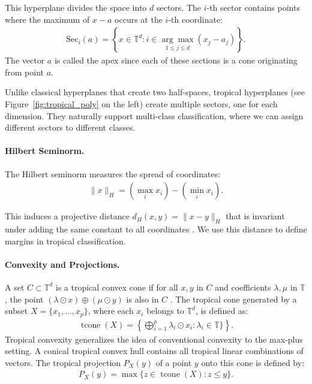 \documentclass{article}
\newcommand{\tcone}{\operatorname{tcone}}
\renewcommand{\leq}{\leqslant}
\newcommand{\trop}{\mathbb{T}}
\begin{document}
This hyperplane divides the space into $d$ sectors. The $i$-th sector contains points where the maximum of $x - a$ occurs at the $i$-th coordinate:
\begin{align}
\text{Sec}_i(a) = \left\{x \in \trop^d : i \in \underset{1\leq j\leq d}{\arg\max} (x_j - a_j)\right\}.
\end{align}
The vector $a$ is called the apex since 
each of these sections is a cone
originating from point $a$.

Unlike classical hyperplanes that create two half-spaces, tropical hyperplanes (see Figure~\ref{fig:tropical_poly} on the left) create multiple sectors, one for each dimension. They naturally support multi-class classification, where we can assign different sectors to different classes.

\paragraph{Hilbert Seminorm.}
The Hilbert seminorm measures the spread of coordinates:
\begin{align}
\|x\|_H = \left(\max_i x_i\right) - \left(\min_i x_i\right).
\end{align}

This induces a projective distance $d_H(x,y) = \|x - y\|_H$ that is invariant under adding the same constant to all coordinates \cite{cohen2004}. We use this distance to define margins in tropical classification.

\paragraph{Convexity and Projections.}
A set $C \subset \trop^d$ is a tropical convex cone if for all $x,y$ in $C$ and coefficients $\lambda,\mu$ in $\trop$,
the point $(\lambda \odot x) \oplus (\mu \odot y)$ is also in $C$ \cite{cohen2004,develin2004}.
The tropical cone generated by a subset $X=\{x_1,\ldots,x_p\}$, where
each $x_i$ belongs to $\trop^d$, is defined as:
\begin{align}
  \tcone(X) = \left\{\bigoplus_{i=1}^p \lambda_i \odot x_i : \lambda_i \in \trop\} \right\}.\label{e-def-tcone}
\end{align}
Tropical convexity generalizes the idea of conventional convexity to the max-plus setting. A conical tropical convex hull contains all tropical linear combinations of vectors. 
The tropical projection $P_X(y)$ of a point $y$ onto this cone is
defined by:
\begin{align}
P_X(y) = \max\{z \in \tcone(X) : z \leq y\}\label{e-canonical}.
\end{align}
\end{document}
